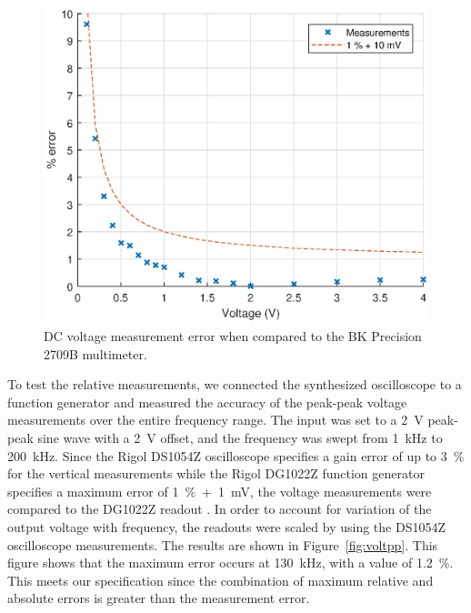 \documentclass[journal,hidelinks]{IEEEtran}
\begin{document}
\begin{figure}[!htb]
  \centering
  \includegraphics[width=\columnwidth]{test-results/volt.eps}
  \caption{DC voltage measurement error when compared to the BK Precision 2709B multimeter.}
  \label{fig:volt}
\end{figure}

To test the relative measurements, we connected the synthesized oscilloscope to a function generator and measured the accuracy of the peak-peak voltage measurements over the entire frequency range. The input was set to a 2~V peak-peak sine wave with a 2~V offset, and the frequency was swept from 1~kHz to 200~kHz. Since the Rigol DS1054Z oscilloscope specifies a gain error of up to 3~\% for the vertical measurements while the Rigol DG1022Z function generator specifies a maximum error of 1~\%~+~1~mV, the voltage measurements were compared to the DG1022Z readout \cite{ds1054z,dg1022z}. In order to account for variation of the output voltage with frequency, the readouts were scaled by using the DS1054Z oscilloscope measurements. The results are shown in Figure~\ref{fig:voltpp}. This figure shows that the maximum error occurs at 130~kHz, with a value of 1.2~\%. This meets our specification since the combination of maximum relative and absolute errors is greater than the measurement error.
\end{document}
